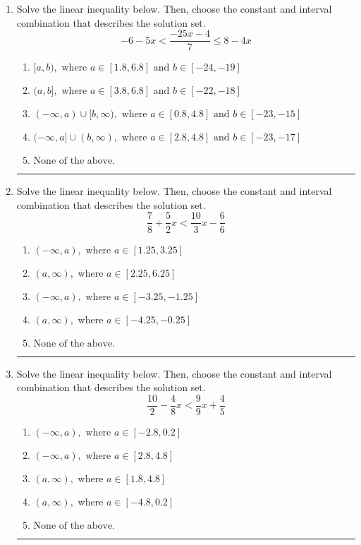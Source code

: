 \documentclass[14pt]{extbook}
\newcommand{\litem}[1]{\item#1\hspace*{-1cm}\rule{\textwidth}{0.4pt}}
\begin{document}
\begin{enumerate}
{\begin{enumerate}[label=\Alph*.]
\end{enumerate} }
\litem{
Solve the linear inequality below. Then, choose the constant and interval combination that describes the solution set.\[ -6 - 5 x < \frac{-25 x - 4}{7} \leq 8 - 4 x \]\begin{enumerate}[label=\Alph*.]
\item \( [a, b), \text{ where } a \in [1.8, 6.8] \text{ and } b \in [-24, -19] \)
\item \( (a, b], \text{ where } a \in [3.8, 6.8] \text{ and } b \in [-22, -18] \)
\item \( (-\infty, a) \cup [b, \infty), \text{ where } a \in [0.8, 4.8] \text{ and } b \in [-23, -15] \)
\item \( (-\infty, a] \cup (b, \infty), \text{ where } a \in [2.8, 4.8] \text{ and } b \in [-23, -17] \)
\item \( \text{None of the above.} \)

\end{enumerate} }
\litem{
Solve the linear inequality below. Then, choose the constant and interval combination that describes the solution set.\[ \frac{7}{8} + \frac{5}{2} x < \frac{10}{3} x - \frac{6}{6} \]\begin{enumerate}[label=\Alph*.]
\item \( (-\infty, a), \text{ where } a \in [1.25, 3.25] \)
\item \( (a, \infty), \text{ where } a \in [2.25, 6.25] \)
\item \( (-\infty, a), \text{ where } a \in [-3.25, -1.25] \)
\item \( (a, \infty), \text{ where } a \in [-4.25, -0.25] \)
\item \( \text{None of the above}. \)

\end{enumerate} }
\litem{
Solve the linear inequality below. Then, choose the constant and interval combination that describes the solution set.\[ \frac{10}{2} - \frac{4}{8} x < \frac{9}{9} x + \frac{4}{5} \]\begin{enumerate}[label=\Alph*.]
\item \( (-\infty, a), \text{ where } a \in [-2.8, 0.2] \)
\item \( (-\infty, a), \text{ where } a \in [2.8, 4.8] \)
\item \( (a, \infty), \text{ where } a \in [1.8, 4.8] \)
\item \( (a, \infty), \text{ where } a \in [-4.8, 0.2] \)
\item \( \text{None of the above}. \)


\end{enumerate}}
\end{enumerate}
\end{document}
